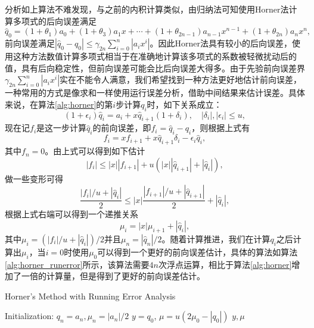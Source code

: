 \documentclass[a4paper,10pt]{ctexart}
\begin{document}
分析如上算法不难发现，与之前的内积计算类似，由归纳法可知使用Horner法计算多项式的后向误差满足
\begin{equation}
    \hat{q}_0 = (1+\theta_1)a_0 + (1+\theta_3)a_1x + \cdots + (1+\theta_{2n-1})a_{n-1}x^{n-1} + (1+\theta_{2n})a_n x^n,
\end{equation}
前向误差满足$ |\hat{q}_0-q_0|\leqslant \gamma_{2n} \sum_{i=0}^n |a_i x^i| $。因此Horner法具有较小的后向误差，使用这种方法数值计算多项式相当于在准确地计算该多项式的系数被轻微扰动后的值，具有后向稳定性，但前向误差可能会比后向误差大得多。由于先验前向误差界$ \gamma_{2n} \sum_{i=0}^n |a_i x^i| $实在不能令人满意，我们希望找到一种方法更好地估计前向误差，一种常用的方式是像求和一样使用运行误差分析，借助中间结果来估计误差。具体来说，在算法\ref{alg:horner}的第$ i $步计算$ q_i $时，如下关系成立：
\begin{equation}
    (1+\epsilon_i) \hat{q}_i = a_i + x \hat{q}_{i+1}(1+\delta_i),\quad |\delta_i|, |\epsilon_i| \leqslant u,
\end{equation}
现在记$ f_i $是这一步计算$ \hat{q}_i $的前向误差，即$ f_i = \hat{q}_i - q_i $，则根据上式有
\[
    f_i = xf_{i+1} + x \hat{q}_{i+1}\delta_i - \epsilon_i \hat{q}_i,
\]
其中$ f_n=0 $。由上式可以得到如下估计
\[
    |f_i| \leqslant |x| |f_{i+1}| + u(|x| |\hat{q}_{i+1}| + |\hat{q}_i|),
\]
做一些变形可得
\[
    \frac{|f_i| / u + |\hat{q}_i|}{2} \leqslant |x|\frac{|f_{i+1}| / u + |\hat{q}_{i+1}|}{2} + |\hat{q}_i|,
\]
根据上式右端可以得到一个递推关系
\begin{equation}
    \mu_i = |x| \mu_{i+1} + |\hat{q}_i|, 
\end{equation}
其中$ \mu_i=(|f_i| / u + |\hat{q}_i|) / 2 $并且$ \mu_n = |\hat{q}_n| / 2 $。随着计算推进，我们在计算$ q_i $之后计算出$ \mu_i $，当$ i=0 $时使用$ \mu_0 $可以得到一个更好的前向误差估计，具体的算法如算法\ref{alg:horner_runerror}所示，该算法需要$ 4n $次浮点运算，相比于算法\ref{alg:horner}增加了一倍的计算量，但是得到了更好的前向误差估计。
\begin{algorithm}
    \caption{Horner's Method with Running Error Analysis}\label{alg:horner_runerror}
    Initialization: $ q_n = a_n, \mu_n = |a_n|/2 $\;
    $ y = q_0 $, $ \mu = u(2\mu_0-|q_0|) $\;
    \Return $ y, \mu $\;
\end{algorithm}
\end{document}
